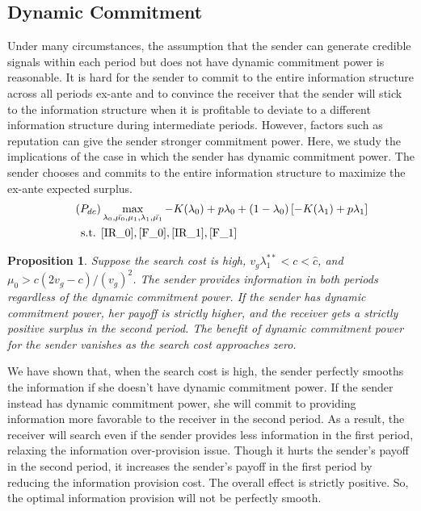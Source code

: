 \documentclass[11pt]{extarticle}
\newtheorem{proposition}{Proposition}
\begin{document}
\subsection{Dynamic Commitment}
Under many circumstances, the assumption that the sender can generate credible signals within each period but does not have dynamic commitment power is reasonable. It is hard for the sender to commit to the entire information structure across all periods ex-ante and to convince the receiver that the sender will stick to the information structure when it is profitable to deviate to a different information structure during intermediate periods. However, factors such as reputation can give the sender stronger commitment power. Here, we study the implications of the case in which the sender has dynamic commitment power. The sender chooses and commits to the entire information structure to maximize the ex-ante expected surplus.
\begin{align}\tag{$P_{dc}$} \label{P2dc}
& \max\limits_{\lambda_0, \bar{\mu_0}, \mu_1, \lambda_1, \bar{\mu_1}} -K(\lambda_0) + p \lambda_0 + (1-\lambda_0) \left[-K(\lambda_1)+p \lambda_1 \right] \nonumber\\
\text{s.t. } &\eqref{IR_0},\eqref{F_0},\eqref{IR_1},\eqref{F_1} \nonumber
\end{align}

\begin{proposition}\label{dch}
	Suppose the search cost is high, $v_g \lambda_1^{**} < c < \widehat{c}$, and $\mu_0 > c(2v_g-c)/(v_g)^2$. The sender provides information in both periods regardless of the dynamic commitment power. If the sender has dynamic commitment power, her payoff is strictly higher, and the receiver gets a strictly positive surplus in the second period. The benefit of dynamic commitment power for the sender vanishes as the search cost approaches zero.
\end{proposition}

We have shown that, when the search cost is high, the sender perfectly smooths the information if she doesn't have dynamic commitment power. If the sender instead has dynamic commitment power, she will commit to providing information more favorable to the receiver in the second period. As a result, the receiver will search even if the sender provides less information in the first period, relaxing the information over-provision issue. Though it hurts the sender's payoff in the second period, it increases the sender's payoff in the first period by reducing the information provision cost. The overall effect is strictly positive. So, the optimal information provision will not be perfectly smooth. 
\end{document}
